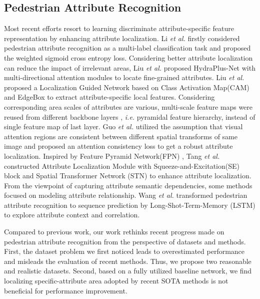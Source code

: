\documentclass[runningheads]{llncs}
\begin{document}
\subsection{Pedestrian Attribute Recognition}
Most recent efforts resort to learning discriminate attribute-specific feature representation by enhancing attribute localization.
Li \textit{et al.} \cite{li2015deepmar} firstly considered pedestrian attribute recognition as a multi-label classification task and proposed the weighted sigmoid cross entropy loss. 
Considering better attribute localization can reduce the impact of irrelevant areas, Liu \textit{et al.} \cite{liu2017hydraplus} proposed HydraPlus-Net with multi-directional attention modules to locate fine-grained attributes. 
Liu \textit{et al.} \cite{liu2018localization} proposed a Localization Guided Network based on Class Activation Map(CAM) \cite{zhou2016learning} and EdgeBox \cite{zitnick2014edge} to extract attribute-specific local features. 
Considering corresponding area scales of attributes are various, multi-scale feature maps were reused from different backbone layers \cite{yu2016weakly,sarafianos2018deep}, \textit{i.e.} pyramidal feature hierarchy, instead of single feature map of last layer. 
Guo \textit{et al.} \cite{guo2019visual} utilized the assumption that visual attention regions are consistent between different spatial transforms of same image and proposed an attention consistency loss to get a robust attribute localization. 
Inspired by Feature Pyramid Network(FPN) \cite{lin2017feature}, Tang \textit{et al.} \cite{tang2019Improving} constructed Attribute Localization Module with Squeeze-and-Excitation(SE) block \cite{hu2018squeeze} and Spatial Transformer Network (STN) \cite{jaderberg2015spatial} to enhance attribute localization. 
From the viewpoint of capturing attribute semantic dependencies, some methods focused on modeling attribute relationship. Wang \textit{et al.} \cite{wang2017attribute} transformed pedestrian attribute recognition to sequence prediction by Long-Shot-Term-Memory (LSTM) \cite{hochreiter1997long} to explore attribute context and correlation.

Compared to previous work, our work rethinks recent progress made on pedestrian attribute recognition from the perspective of datasets and methods. First, the dataset problem we first noticed leads to overestimated performance and misleads the evaluation of recent methods. Thus, we propose two reasonable and realistic datasets. Second, based on a fully utilized baseline network, we find localizing specific-attribute area adopted by recent SOTA methods \cite{sarafianos2018deep,guo2019visual,tang2019Improving} is not beneficial for performance improvement.
\end{document}
